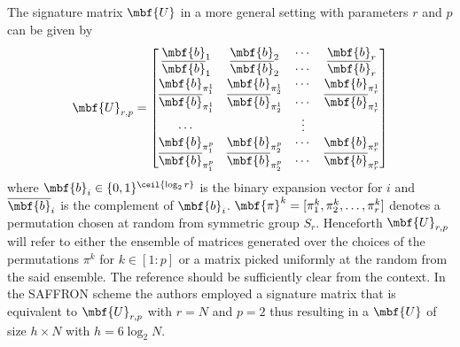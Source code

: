 \documentclass[conference,twocolumn]{IEEEtran}
\begin{document}
 
 The signature matrix 	$\mbf{U}$ in a more general setting with parameters $r$ and $p$ can be given by
 \begin{align}
\label{Eqn:SignatureMatrix}
\mbf{U}_{r,p}=\begin{bmatrix}
\mbf{b}_1  & \mbf{b}_2 &\cdots & \mbf{b}_r \\
\overline{\mbf{b}}_1 & \overline{\mbf{b}}_2 & \cdots & \overline{\mbf{b}}_r\\
\mbf{b}_{\pi^{1}_{1}} & \mbf{b}_{\pi^{1}_{2}} & \cdots & \mbf{b}_{\pi^{1}_{r}}\\
\overline{\mbf{b}}_{\pi^{1}_{1}} & \overline{\mbf{b}}_{\pi^{1}_{2}} & \cdots & \overline{\mbf{b}}_{\pi^{1}_{r}}\\
\cdots &  &\vdots \\
\mbf{b}_{\pi^{p}_{1}} & \mbf{b}_{\pi^{p}_{2}} & \cdots & \mbf{b}_{\pi^{p}_{r}}\\
\overline{\mbf{b}}_{\pi^{p}_{1}} & \overline{\mbf{b}}_{\pi^{p}_{2}} & \cdots & \overline{\mbf{b}}_{\pi^{p}_{r}}
\end{bmatrix}
\end{align}  
where $\mbf{b}_{i}\in\{0,1\}^{\ceil{\log_{2}r}}$ is the binary expansion vector for $i$ and $\overline{\mbf{b}}_{i}$ is the complement of $\mbf{b}_{i}$. $\mbf{\pi}^{k}=[\pi^{k}_1,\pi^{k}_2,\ldots,\pi^{k}_r]$ denotes a permutation chosen at random from symmetric group $S_{r}$. Henceforth $\mbf{U}_{r,p}$ will refer to either the ensemble of matrices generated over the choices of the permutations $\pi^{k}$ for $k\in[1:p]$ or a matrix picked uniformly at the random from the said ensemble. The reference should be sufficiently clear from the context. In the SAFFRON scheme the authors employed a signature matrix that is equivalent to $\mbf{U}_{r,p}$ with $r=N$ and $p=2$ thus resulting in a $\mbf{U}$ of size $h \times N$ with $h=6\log_{2}N$. 
\end{document}
